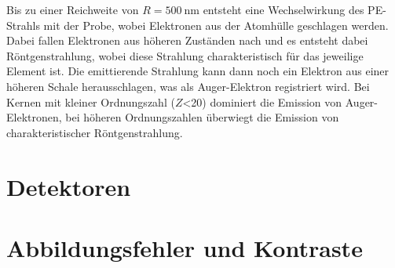 Bis zu einer Reichweite von $R=\SI{500}{\nano\metre}$ entsteht eine Wechselwirkung des PE-Strahls mit der Probe, wobei Elektronen aus der Atomhülle geschlagen werden. Dabei fallen Elektronen aus höheren Zuständen nach und es entsteht dabei Röntgenstrahlung, wobei diese Strahlung charakteristisch für das jeweilige Element ist. Die emittierende Strahlung kann dann noch ein Elektron aus einer höheren Schale herausschlagen, was als Auger-Elektron registriert wird. Bei Kernen mit kleiner Ordnungszahl ($Z$<20) dominiert die Emission von Auger-Elektronen, bei
höheren Ordnungszahlen überwiegt die Emission von charakteristischer Röntgenstrahlung.

\section{Detektoren}
\label{sec:detect}

\section{Abbildungsfehler und Kontraste}
\label{sec:imageErrorKontrast}

